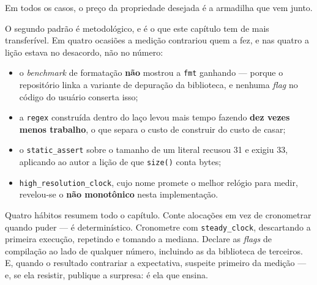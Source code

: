 Em todos os casos, o preço da propriedade desejada é a armadilha que vem junto.

O segundo padrão é metodológico, e é o que este capítulo tem de mais
transferível. Em quatro ocasiões a medição contrariou quem a fez, e nas quatro a
lição estava no desacordo, não no número:

\begin{itemize}
\item o \emph{benchmark} de formatação \textbf{não} mostrou a \texttt{fmt}
      ganhando --- porque o repositório linka a variante de depuração da
      biblioteca, e nenhuma \emph{flag} no código do usuário conserta isso;
\item a \texttt{regex} construída dentro do laço levou mais tempo fazendo
      \textbf{dez vezes menos trabalho}, o que separa o custo de construir do
      custo de casar;
\item o \texttt{static\_assert} sobre o tamanho de um literal recusou 31 e
      exigiu 33, aplicando ao autor a lição de que \texttt{size()} conta bytes;
\item \texttt{high\_resolution\_clock}, cujo nome promete o melhor relógio para
      medir, revelou-se o \textbf{não monotônico} nesta implementação.
\end{itemize}

\begin{regra}
Quatro hábitos resumem todo o capítulo. Conte alocações em vez de cronometrar
quando puder --- é determinístico. Cronometre com \texttt{steady\_clock},
descartando a primeira execução, repetindo e tomando a mediana. Declare as
\emph{flags} de compilação ao lado de qualquer número, incluindo as da
biblioteca de terceiros. E, quando o resultado contrariar a expectativa,
suspeite primeiro da medição --- e, se ela resistir, publique a surpresa: é ela
que ensina.
\end{regra}
